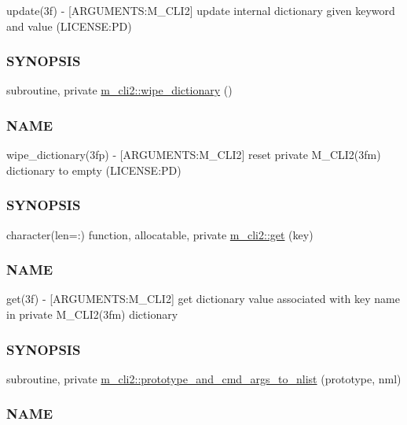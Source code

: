 \begin{DoxyCompactItemize}
\begin{DoxyCompactList}
update(3f) -\/ \mbox{[}A\+R\+G\+U\+M\+E\+N\+TS\+:M\+\_\+\+C\+L\+I2\mbox{]} update internal dictionary given keyword and value (L\+I\+C\+E\+N\+SE\+:PD) \subsubsection*{S\+Y\+N\+O\+P\+S\+IS}\end{DoxyCompactList}\item 
subroutine, private \mbox{\hyperlink{namespacem__cli2_ab1525b0419475486f520ef502daa5e94}{m\+\_\+cli2\+::wipe\+\_\+dictionary}} ()
\begin{DoxyCompactList}\small\item\em \subsubsection*{N\+A\+ME}

wipe\+\_\+dictionary(3fp) -\/ \mbox{[}A\+R\+G\+U\+M\+E\+N\+TS\+:M\+\_\+\+C\+L\+I2\mbox{]} reset private M\+\_\+\+C\+L\+I2(3fm) dictionary to empty (L\+I\+C\+E\+N\+SE\+:PD) \subsubsection*{S\+Y\+N\+O\+P\+S\+IS}\end{DoxyCompactList}\item 
character(len=\+:) function, allocatable, private \mbox{\hyperlink{namespacem__cli2_aa92e8ad0300d4e324e29eae1ab9d04b4}{m\+\_\+cli2\+::get}} (key)
\begin{DoxyCompactList}\small\item\em \subsubsection*{N\+A\+ME}

get(3f) -\/ \mbox{[}A\+R\+G\+U\+M\+E\+N\+TS\+:M\+\_\+\+C\+L\+I2\mbox{]} get dictionary value associated with key name in private M\+\_\+\+C\+L\+I2(3fm) dictionary \subsubsection*{S\+Y\+N\+O\+P\+S\+IS}\end{DoxyCompactList}\item 
subroutine, private \mbox{\hyperlink{namespacem__cli2_a46f31858773ff1b4cf96329a14130bf2}{m\+\_\+cli2\+::prototype\+\_\+and\+\_\+cmd\+\_\+args\+\_\+to\+\_\+nlist}} (prototype, nml)
\begin{DoxyCompactList}\small\item\em \subsubsection*{N\+A\+ME}


\end{DoxyCompactList}
\end{DoxyCompactItemize}
